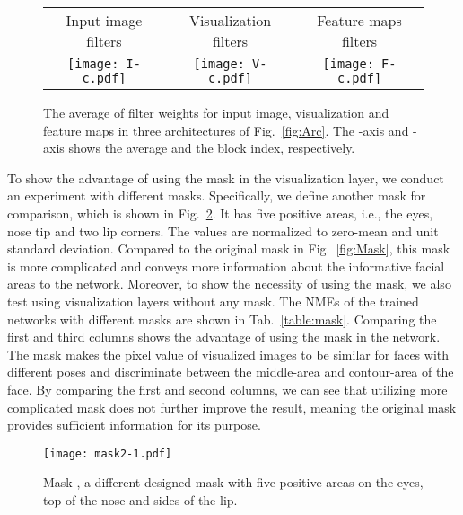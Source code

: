 \begin{figure}\tiny
\figvspace\vspace{-2mm}
\begin{center}
\begin{tabular}{@{}ccc@{}}
 Input image filters &  Visualization filters &  Feature maps filters\\
\texttt{[image: I-c.pdf]} &
\texttt{[image: V-c.pdf]} &
\texttt{[image: F-c.pdf]}



\end{tabular}
\end{center}
\figvspace
\caption{The average of filter weights for input image, visualization and feature maps in three architectures of Fig.~\ref{fig:Arc}. The -axis and -axis shows the average and the block index, respectively.} 
\label{fig:Arc_Analysis}\vspace{-7mm}

\end{figure}


To show the advantage of using the mask in the visualization layer, we conduct an experiment with different masks. 
Specifically, we define another mask for comparison, which is shown in Fig.~\ref{fig:Mask2}. 
It has five positive areas, i.e., the eyes, nose tip and two lip corners. 
The values are normalized to zero-mean and unit standard deviation. 
Compared to the original mask in Fig.~\ref{fig:Mask}, this mask is more complicated and conveys more information about the informative facial areas to the network. 
Moreover, to show the necessity of using the mask, we also test using visualization layers without any mask. 
The NMEs of the trained networks with different masks are shown in Tab.~\ref{table:mask}. 
Comparing the first and third columns shows the advantage of using the mask in the network. The mask makes the pixel value of visualized images to be similar for faces with different poses and discriminate between the middle-area and contour-area of the face. By comparing the first and second columns, we can see that utilizing more complicated mask does not further improve the result, meaning the original mask provides sufficient information for its purpose. 

\begin{figure}[t!]\small
\begin{center}
\texttt{[image: mask2-1.pdf]} 
\end{center}
\figvspace
\caption{Mask , a different designed mask with five positive areas on the eyes, top of the nose and sides of the lip.} 
\label{fig:Mask2} \vspace{-2mm}\end{figure}



